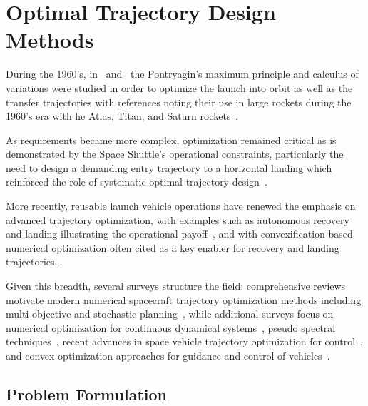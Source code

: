 
\section{Optimal Trajectory Design Methods}

During the 1960's, in~\cite{bryson1958optimum} and~\cite{Lawden} the Pontryagin’s maximum principle and calculus of variations were studied in order to optimize the launch into orbit as well as the transfer trajectories with references noting their use in large rockets during the 1960's era with he Atlas, Titan, and Saturn rockets~\cite{brusch1976trajectory}.

As requirements became more complex, optimization remained critical as is demonstrated by the Space Shuttle's operational constraints, particularly the need to design a demanding entry trajectory to a horizontal landing which reinforced the role of systematic optimal trajectory design~\cite{BollinoNavalOptim}. 

More recently, reusable launch vehicle operations have renewed the emphasis on advanced trajectory optimization, with examples such as autonomous recovery and landing illustrating the operational payoff~\cite{Edberg}, and with convexification-based numerical optimization often cited as a key enabler for recovery and landing trajectories~\cite{Convex}.

Given this breadth, several surveys structure the field: comprehensive reviews motivate modern numerical spacecraft trajectory optimization methods including multi-objective and stochastic planning~\cite{Optimization_Review}, while additional surveys focus on numerical optimization for continuous dynamical systems~\cite{BettsSurvey1998}, pseudo spectral techniques~\cite{RaoPseudo}, recent advances in space vehicle trajectory optimization for control~\cite{MALYUTA2021282}, and convex optimization approaches for guidance and control of vehicles~\cite{WANG2024100957}.


\subsection{Problem Formulation}

